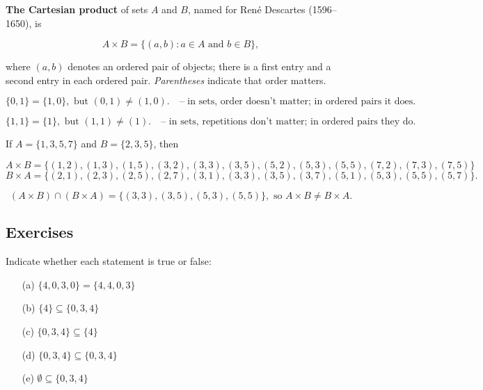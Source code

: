 \begin{definition}
    \textbf{The Cartesian product} of sets \( A \) and \( B \), named for Ren\'e Descartes (1596--1650), is

\[ A \times B = \{(a, b): a \in A \text{ and } b \in B\}, \]

where \( (a,b) \) denotes an ordered pair of objects; there is a first entry and a second entry in each ordered pair. \emph{Parentheses} indicate that order matters.

\end{definition}
\begin{remark}
    \[ \{0, 1\} = \{1, 0\}, \text{ but } (0, 1) \neq (1, 0). \quad \text{-- in sets, order doesn't matter; in ordered pairs it does.} \]
    
\[ \{1, 1\} = \{1\}, \text{ but } (1, 1) \neq (1). \quad \text{-- in sets, repetitions don't matter; in ordered pairs they do.} \]

\end{remark}
\begin{example}
    If \( A = \{1,3,5,7\} \) and \( B = \{2,3,5\} \), then

\[ A \times B = \{(1, 2), (1, 3), (1, 5), (3, 2), (3, 3), (3, 5), (5, 2), (5, 3), (5, 5), (7, 2), (7, 3), (7, 5)\} \]
\[ B \times A = \{(2, 1), (2, 3), (2, 5), (2, 7), (3, 1), (3, 3), (3, 5), (3, 7), (5, 1), (5, 3), (5, 5), (5, 7)\}. \]

\[ (A \times B) \cap (B \times A) = \{(3,3), (3,5), (5,3), (5,5)\}, \text{ so } A \times B \neq B \times A. \]
\end{example}

\subsection{Exercises}
\begin{exercise}
Indicate whether each statement is true or false:
\begin{enumerate}
    \item[(a)] \(\{4, 0, 3, 0\} = \{4, 4, 0, 3\}\)
    \item[(b)] \(\{4\} \subseteq \{0, 3, 4\}\)
    \item[(c)] \(\{0, 3, 4\} \subseteq \{4\}\)
    \item[(d)] \(\{0, 3, 4\} \subseteq \{0, 3, 4\}\)
    \item[(e)] \(\emptyset \subseteq \{0, 3, 4\}\)
\end{enumerate}

\end{exercise}


